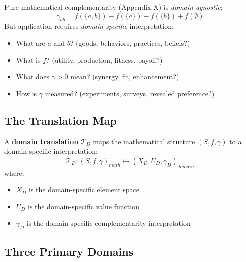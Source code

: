 \begin{tcolorbox}[colback=yellow!5!white,colframe=yellow!75!black,title=\textbf{The Central Challenge}]
Pure mathematical complementarity (Appendix X) is \textit{domain-agnostic}:
\begin{equation}
\gamma_{ab} = f(\{a,b\}) - f(\{a\}) - f(\{b\}) + f(\emptyset)
\end{equation}
But application requires \textit{domain-specific} interpretation:
\begin{itemize}[noitemsep]
    \item What are $a$ and $b$? (goods, behaviors, practices, beliefs?)
    \item What is $f$? (utility, production, fitness, payoff?)
    \item What does $\gamma > 0$ mean? (synergy, fit, enhancement?)
    \item How is $\gamma$ measured? (experiments, surveys, revealed preference?)
\end{itemize}
\end{tcolorbox}

\subsection{The Translation Map}

\begin{definition}
A \textbf{domain translation} $\mathcal{T}_D$ maps the mathematical structure $(S, f, \gamma)$ to a domain-specific interpretation:
\begin{equation}
\mathcal{T}_D: (S, f, \gamma)_{math} \mapsto (X_D, U_D, \gamma_D)_{domain}
\end{equation}
where:
\begin{itemize}[noitemsep]
    \item $X_D$ is the domain-specific element space
    \item $U_D$ is the domain-specific value function
    \item $\gamma_D$ is the domain-specific complementarity interpretation
\end{itemize}
\end{definition}

\subsection{Three Primary Domains}

